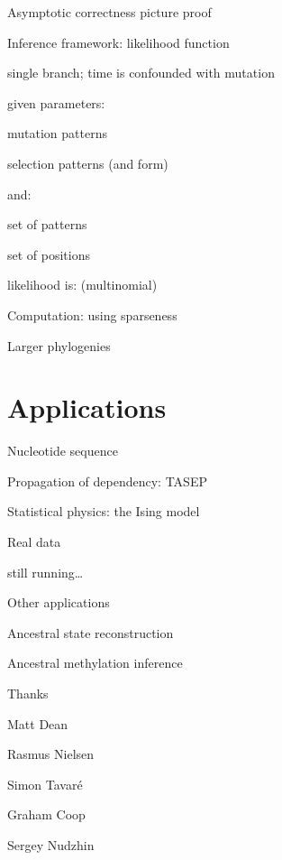 \documentclass[smaller]{beamer}
\begin{document}
\begin{frame}{Asymptotic correctness}
  picture proof
\end{frame}

\begin{frame}{Inference framework: likelihood function}

  single branch; time is confounded with mutation

  given parameters:
    
    mutation patterns

    selection patterns (and form)


  and:

    set of patterns

    set of positions


  likelihood is: (multinomial)

\end{frame}

\begin{frame}{Computation: using sparseness}

\end{frame}

\begin{frame}{Larger phylogenies}

\end{frame}


\section{Applications}

\begin{frame}{Nucleotide sequence}

\end{frame}

\begin{frame}{Propagation of dependency: TASEP}

\end{frame}

\begin{frame}{Statistical physics: the Ising model}

\end{frame}

\begin{frame}{Real data}

  still running\ldots

\end{frame}

\begin{frame}{Other applications}

  Ancestral state reconstruction

  Ancestral methylation inference

\end{frame}


\begin{frame}{Thanks}

  Matt Dean
  
  Rasmus Nielsen

  Simon Tavar\'e

  Graham Coop

  Sergey Nudzhin

\end{frame}
\end{document}
